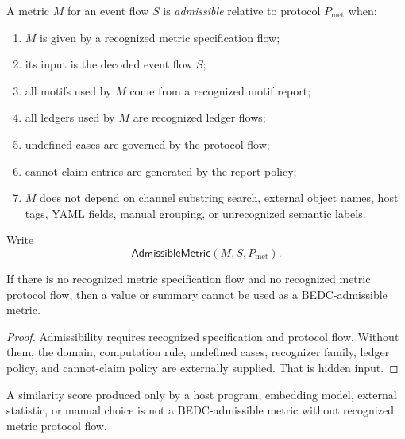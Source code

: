 \begin{definition}
\label{def:metric-report-admissible}
A metric $M$ for an event flow $S$ is \emph{admissible} relative to protocol $P_{\mathrm{met}}$ when:
\begin{enumerate}
\item $M$ is given by a recognized metric specification flow;
\item its input is the decoded event flow $S$;
\item all motifs used by $M$ come from a recognized motif report;
\item all ledgers used by $M$ are recognized ledger flows;
\item undefined cases are governed by the protocol flow;
\item cannot-claim entries are generated by the report policy;
\item $M$ does not depend on channel substring search, external object names, host tags, YAML fields, manual grouping, or unrecognized semantic labels.
\end{enumerate}
Write
$$
  \mathsf{AdmissibleMetric}(M,S,P_{\mathrm{met}}).
$$
\end{definition}

\begin{theorem}
\label{thm:metric-report-unrecognized-inadmissible}
If there is no recognized metric specification flow and no recognized metric protocol flow, then a value or summary cannot be used as a BEDC-admissible metric.
\end{theorem}

\begin{proof}
Admissibility requires recognized specification and protocol flow. Without them, the domain, computation rule, undefined cases, recognizer family, ledger policy, and cannot-claim policy are externally supplied. That is hidden input.
\end{proof}

\begin{corollary}
\label{cor:metric-report-host-score-not-admissible}
A similarity score produced only by a host program, embedding model, external statistic, or manual choice is not a BEDC-admissible metric without recognized metric protocol flow.
\end{corollary}

